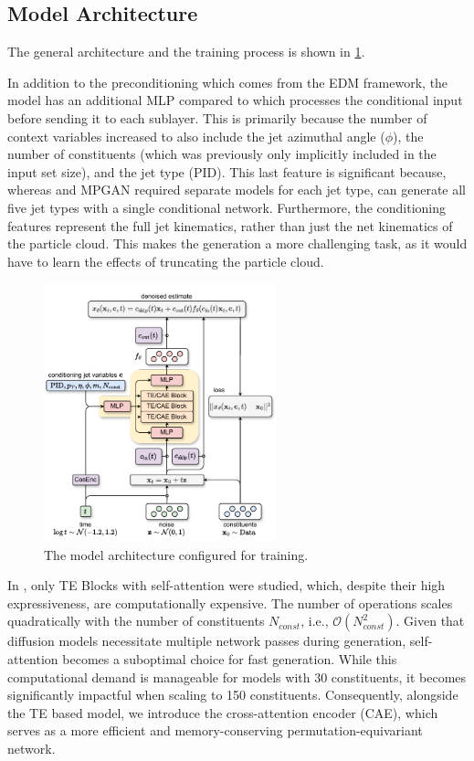\subsection{Model Architecture}

The general \pcdroid architecture and the training process is shown in \cref{fig:droid_arch_train}.

In addition to the preconditioning which comes from the EDM framework, the model has an additional MLP compared to \pcjedi which processes the conditional input before sending it to each sublayer.
This is primarily because the number of context variables increased to also include the jet azimuthal angle ($\phi$), the number of constituents (which was previously only implicitly included in the input set size), and the jet type (PID).
This last feature is significant because, whereas \pcjedi and MPGAN required separate models for each jet type, \pcdroid can generate all five jet types with a single conditional network.
Furthermore, the conditioning features represent the full jet kinematics, rather than just the net kinematics of the particle cloud.
This makes the generation a more challenging task, as it would have to learn the effects of truncating the particle cloud.

\begin{figure}[htpb]
    \centering
    \includegraphics[width=0.6\textwidth]{Figures/jet_generation/pcdroid.pdf}
    \caption{The \pcdroid model architecture configured for training.}
    \label{fig:droid_arch_train}
\end{figure}

In \pcjedi, only TE Blocks with self-attention were studied, which, despite their high expressiveness, are computationally expensive.
The number of operations scales quadratically with the number of constituents $N_{const}$, i.e., $\mathcal{O}(N_{const}^2)$.
Given that diffusion models necessitate multiple network passes during generation, self-attention becomes a suboptimal choice for fast generation.
While this computational demand is manageable for models with 30 constituents, it becomes significantly impactful when scaling to 150 constituents.
Consequently, alongside the TE based model, we introduce the cross-attention encoder (CAE), which serves as a more efficient and memory-conserving permutation-equivariant network.

